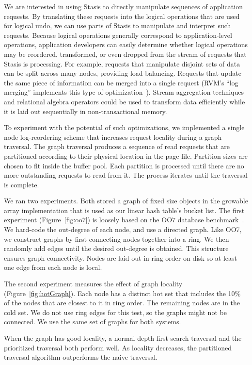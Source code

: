 \documentclass[letterpaper,twocolumn,10pt]{article}
\newcommand{\yad}{Stasis\xspace}
\begin{document}
We are interested in using \yad to directly manipulate sequences of
application requests.  By translating these requests into the logical
operations that are used for logical undo, we can use parts of \yad to
manipulate and interpret such requests.  Because logical operations generally
correspond to application-level operations, application developers can easily determine whether
logical operations may be reordered, transformed, or even dropped from
the stream of requests that \yad is processing.  For example,
requests that manipulate disjoint sets of data can be split across
many nodes, providing load balancing.  Requests that update the same piece of information
can be merged into a single request (RVM's ``log merging''
implements this type of optimization~\cite{lrvm}).  Stream aggregation
techniques and relational algebra operators could be used to
 transform data efficiently while it is laid out sequentially in
non-transactional memory.

To experiment with the potential of such optimizations, we implemented
a single node log-reordering scheme that increases request locality
during a graph traversal.  The graph traversal produces a sequence of
read requests that are partitioned according to their physical
location in the page file.  Partition sizes are chosen to fit inside
the buffer pool.  Each partition is processed until there are no more
outstanding requests to read from it.  The process iterates until the
traversal is complete.

We ran two experiments.  Both stored a graph of fixed size objects in
the growable array implementation that is used as our linear
hash table's bucket list.
The first experiment (Figure~\ref{fig:oo7})
is loosely based on the OO7 database benchmark~\cite{oo7}.  We
hard-code the out-degree of each node, and use a directed graph.  Like OO7, we
construct graphs by first connecting nodes together into a ring.
We then randomly add edges until the desired
out-degree is obtained.  This structure ensures graph connectivity.
Nodes are laid out in ring order on disk so at least
one edge from each node is local.

The second experiment measures the effect of graph locality
(Figure~\ref{fig:hotGraph}).  Each node has a distinct hot set that
includes the 10\% of the nodes that are closest to it in ring order.
The remaining nodes are in the cold set.  We do not use ring edges for
this test, so the graphs might not be connected. We use the same set
of graphs for both systems.

When the graph has good locality, a normal depth first search
traversal and the prioritized traversal both perform well.  As
locality decreases, the partitioned traversal algorithm outperforms
the naive traversal.
\end{document}
